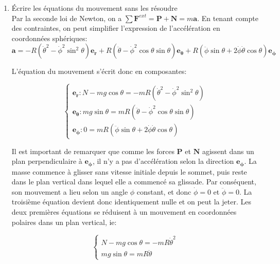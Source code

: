 \documentclass[a4paper,10pt,twoside]{article}
\begin{document}
\begin{enumerate}
    \item Écrire les équations du mouvement sans les résoudre \\
    Par la seconde loi de Newton, on a $\sum \mathbf{F}^{ext} = \mathbf{P} + \mathbf{N} = m \mathbf{a}$. En tenant compte des contraintes, on peut simplifier l'expression de l'accélération en coordonnées sphériques:
    \[ \mathbf{a} = -R(\dot \theta^2 - \dot\phi^2\sin^2{\theta}) \mathbf{e_r} + 
R (\ddot \theta - \dot{\phi}^2 \cos{\theta} \sin{\theta}) \mathbf{e_\theta} + R (\ddot \phi \sin{\theta}+  2 \dot{\phi} \dot{\theta} \cos{\theta}) \mathbf{e_\phi} \]

L'équation du mouvement s'écrit donc en composantes: 

\begin{equation}
    \begin{cases}
         \mathbf{e_r} : N -mg\cos{\theta} =  -mR(\dot \theta^2 - \dot\phi^2\sin^2{\theta}) \\
         \mathbf{e_\theta} : mg\sin{\theta} = mR (\ddot \theta - \dot{\phi}^2 \cos{\theta} \sin{\theta}) \\
         \mathbf{e_\phi}: 0 = m R (\ddot \phi \sin{\theta}+  2 \dot{\phi} \dot{\theta} \cos{\theta})
    \end{cases}
\end{equation}

Il est important de remarquer que comme les forces $\mathbf{P}$ et $\mathbf{N}$ agissent dans un plan perpendiculaire à $\mathbf{e_\phi}$, il n'y a pas d'accélération selon la direction $\mathbf{e_\phi}$. La masse commence à glisser sans vitesse initiale depuis le sommet, puis reste dans le plan vertical dans lequel elle a commencé sa glissade. Par conséquent, son mouvement a lieu selon un angle $\phi$ constant, et donc $\dot{\phi} = 0$ et $\ddot{\phi} = 0$. La troisième équation devient donc identiquement nulle et on peut la jeter. Les deux premières équations se réduisent à un mouvement en coordonnées polaires dans un plan vertical, ie: 

\begin{equation}
    \begin{cases}
         N -mg\cos{\theta} =  -mR \dot \theta^2 \\
         mg\sin{\theta} = mR\ddot{\theta}
    \end{cases}
\end{equation}


\end{enumerate}
\end{document}

